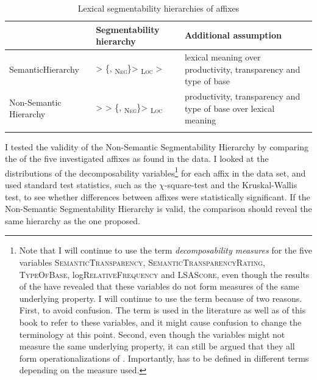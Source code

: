 \begin{table}
\begin{tabularx}{\textwidth}{p{2.25cm}lQ}
	\lsptoprule
	& {Segmentability hierarchy} & {Additional assumption} \\\midrule
	Semantic\newline Hierarchy &  > \{, \textsubscript{\textsc{Neg}}\}>  \textsubscript{\textsc{Loc}} > & lexical meaning over productivity, transparency and type of base\\\tablevspace
	Non-Semantic Hierarchy&  	 >  > \{, \textsubscript{\textsc{Neg}}\}>  \textsubscript{\textsc{Loc}}& productivity, transparency and  type of base	over lexical meaning\\
	\lspbottomrule
\end{tabularx}
	\caption{Lexical segmentability hierarchies of  affixes\label{fig:Segmentability hierarchies of  affixes repetition 2}}
\end{table}


I tested the validity of the Non-Semantic Segmentability Hierarchy by comparing the  of the five investigated affixes as found in the data. I looked at the distributions of the decomposability variables\footnote{Note that I will continue to use the term \textit{{decomposability} measures} for the five variables \textsc{SemanticTransparency}, \textsc{SemanticTransparencyRating}, \textsc{TypeOfBase}, log\textsc{RelativeFrequency} and \textsc{LSAScore}, even though the results of the  have revealed that these variables do not form measures of the same underlying property. I will continue to use the term  because of two reasons. First, to avoid confusion. The term is used in the literature as well as  of this book to refer to these variables, and it might cause confusion to change the terminology at this point. Second, even though the variables might not measure the same underlying property, it can still be argued that they all form operationalizations of . Importantly,  has to be defined in different terms depending on the  measure used.} for each affix in the data set, and used standard test statistics, such as the $\chi$-square-test and the Kruskal-Wallis test, to see whether differences between affixes were statistically significant.
If the Non-Semantic Segmentability Hierarchy is valid, the comparison should reveal the same  hierarchy  as the one proposed. 


